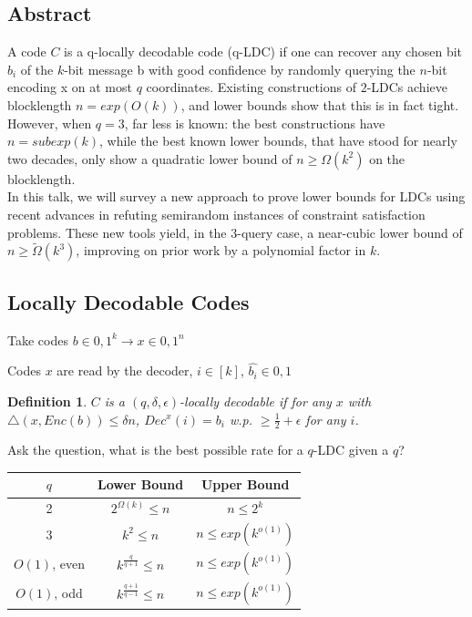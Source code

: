 \documentclass{article}
\newtheorem{definition}{Definition}
\begin{document}
\subsection{Abstract}

A code $C$ is a q-locally decodable code (q-LDC) if one can recover any chosen bit $b_i$ of the $k$-bit message b with good confidence by randomly querying the $n$-bit encoding x on at most $q$ coordinates. Existing constructions of $2$-LDCs achieve blocklength $n = exp(O(k))$, and lower bounds show that this is in fact tight. However, when $q = 3$, far less is known: the best constructions have $n = subexp(k)$, while the best known lower bounds, that have stood for nearly two decades, only show a quadratic lower bound of $n \geq \Omega(k^2)$ on the blocklength.\\

\noindent In this talk, we will survey a new approach to prove lower bounds for LDCs using recent advances in refuting semirandom instances of constraint satisfaction problems. These new tools yield, in the $3$-query case, a near-cubic lower bound of $n \geq \tilde{\Omega}(k^3)$, improving on prior work by a polynomial factor in $k$.

\subsection{Locally Decodable Codes}

Take codes $b \in {0,1}^k \rightarrow x \in {0,1}^n$

\noindent Codes $x$ are read by the decoder, $i \in [k]$, $\hat{b_i} \in {0,1}$

\begin{definition}
$C$ is a $(q, \delta, \epsilon)$-locally decodable if for any $x$ with $\bigtriangleup(x, Enc(b)) \leq \delta n$, $Dec^x(i) = b_i$ w.p. $\geq \frac{1}{2} + \epsilon$ for any $i$.
\end{definition}

\noindent Ask the question, what is the best possible rate for a $q$-LDC given a $q$?

\begin{center}
\begin{tabular}{ |c|c|c| } 
 \hline
 $q$ & Lower Bound & Upper Bound \\
 \hline
 2 & $2^{\Omega(k)} \leq n$ & $n \leq 2^k$ \\ 
 3 & $k^2 \leq n$ & $n \leq exp(k^{o(1)})$ \\
 $O(1)$, even & $k^{\frac{q}{q+1}} \leq n$ & $n \leq exp(k^{o(1)})$ \\ 
 $O(1)$, odd & $k^{\frac{q+1}{q-1}} \leq n$ & $n \leq exp(k^{o(1)})$ \\ 
 \hline
\end{tabular}
\end{center}
\end{document}
